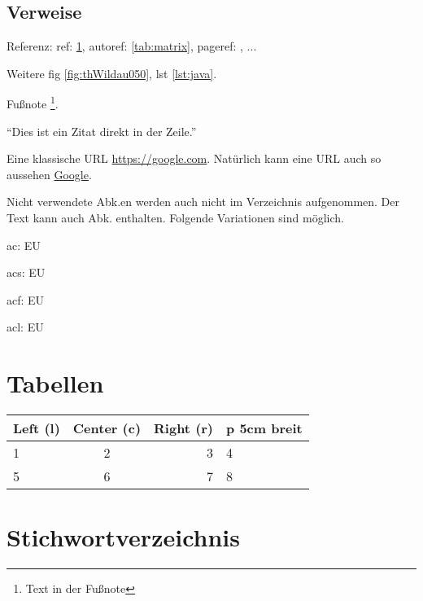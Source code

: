 \subsection{Verweise}\label{ssec:verweise}

Referenz: ref: \ref{tab:matrix}, autoref: \autoref{tab:matrix}, pageref: \pageref{tab:matrix}, ...\par

Weitere fig \ref{fig:thWildau050}, lst \ref{lst:java}.\par

Fußnote \footnote{Text in der Fußnote}.\par

\enquote{Dies ist ein Zitat direkt in der Zeile.}\par

Eine klassische URL \url{https://google.com}. %
Natürlich kann eine URL auch so aussehen \href{https://google.com}{Google}.\par

Nicht verwendete \ac{Abk.}en werden auch nicht im Verzeichnis aufgenommen. Der Text kann auch \ac{Abk.} enthalten. Folgende Variationen sind möglich.\par
ac: \ac{EU}\par
acs: \acs{EU}\par
acf: \acf{EU}\par
acl: \acl{EU}\par

\section{Tabellen}\label{sec:tabellen}

\begin{table}[htp]
	\centering
	\begin{tabular}{ | l | c | r | p{5cm} | }
		\hline
		\textbf{Left (l)} & \textbf{Center (c)} & \textbf{Right (r)} & \textbf{p 5cm breit}\\
		\hline
		1 & 2 & 3 & 4\\
		\hline
		5 & 6 & 7 & 8\\
		\hline
	\end{tabular}
	\label{tab:matrix}
\end{table}

\section{Stichwortverzeichnis}\label{sec:idx}

